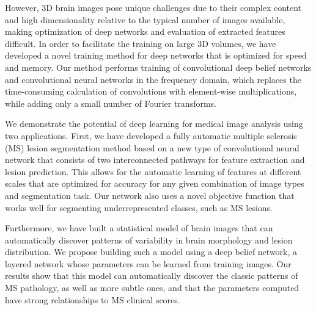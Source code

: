 However, 3D brain images pose unique challenges due to their complex content
and high dimensionality relative to the typical number of images available,
making optimization of deep networks and evaluation of extracted features
difficult. In order to facilitate the training on large 3D volumes, we have
developed a novel training method for deep networks that is optimized
for speed and memory. Our method performs training of convolutional deep belief
networks and convolutional neural networks in the frequency domain, which
replaces the time-consuming calculation of convolutions with element-wise
multiplications, while adding only a small number of Fourier transforms.

We demonstrate the potential of deep learning for medical image analysis using
two applications. First, we have developed a fully automatic multiple sclerosis
(MS) lesion segmentation method based on a new type of convolutional neural
network that consists of two interconnected pathways for feature extraction and
lesion prediction. This allows for the automatic learning of features at
different scales that are optimized for accuracy for any given combination of
image types and segmentation task. Our network also uses a novel objective
function that works well for segmenting underrepresented classes, such as MS
lesions.

Furthermore, we have built a statistical model of brain images that can
automatically discover patterns of variability in brain morphology and lesion
distribution. We propose building such a model using a deep belief network, a
layered network whose parameters can be learned from training images. Our
results show that this model can automatically discover the classic patterns of
MS pathology, as well as more subtle ones, and that the parameters computed have
strong relationships to MS clinical scores.

